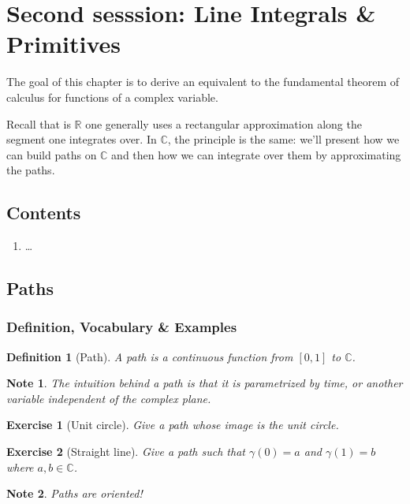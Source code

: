 \documentclass{article}
\newtheorem*{defi}{Definition}
\newtheorem*{note}{Note}
\newtheorem{exo}{Exercise}
\begin{document}
\newpage
\section{Second sesssion: Line Integrals \& Primitives} 
The goal of this chapter is to derive an equivalent to the fundamental theorem of calculus for functions of a complex variable.

Recall that is $\mathbb{R}$ one generally uses a rectangular approximation along the segment one integrates over. In $\mathbb{C}$, the principle is the same: we'll present how we can build paths on $\mathbb{C}$ and then how we can integrate over them by approximating the paths.
\subsection*{Contents}
\begin{enumerate}
    \item \dots
        
\end{enumerate}

\subsection{Paths}
\subsubsection{Definition, Vocabulary \& Examples}
\begin{defi}[Path]
    A path is a continuous function from $[0, 1]$ to $\mathbb{C}$.
\end{defi}

\begin{note}
    The intuition behind a path is that it is parametrized by time, or another variable independent of the complex plane.
\end{note}

\begin{exo}[Unit circle]
    Give a path whose image is the unit circle.
\end{exo}

\begin{exo}[Straight line]
    Give a path such that $\gamma(0) = a$ and $\gamma(1) = b$ where $a, b \in \mathbb{C}$. 
\end{exo}

\begin{note}
    Paths are oriented!
\end{note}
\end{document}
